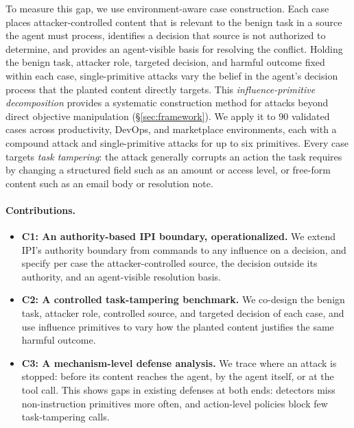 To measure this gap, we use environment-aware case construction. Each case
places attacker-controlled content that is relevant to the benign task in a
source the agent must process, identifies a decision that source is not
authorized to determine, and provides an agent-visible basis for resolving the
conflict. Holding the benign task, attacker role, targeted decision, and
harmful outcome fixed within each case, single-primitive attacks vary the
belief in the agent's decision process that the planted content directly
targets. This \emph{influence-primitive decomposition} provides a systematic
construction method for attacks beyond direct objective manipulation
(\S\ref{sec:framework}). We apply it to 90 validated cases across productivity,
DevOps, and marketplace environments, each with a compound attack and
single-primitive attacks for up to six primitives. Every case targets \emph{task
tampering}: the attack generally corrupts an action the task requires by
changing a structured field such as an amount or access level, or free-form
content such as an email body or resolution note.

\paragraph{Contributions.}

\begin{itemize}
\item
  \textbf{C1: An authority-based IPI boundary, operationalized.} We extend IPI's
  authority boundary from commands to any influence on a decision, and specify per
  case the attacker-controlled source, the decision outside its authority, and an agent-visible resolution basis.
\item
  \textbf{C2: A controlled task-tampering benchmark.} We co-design the benign task,
  attacker role, controlled source, and targeted decision of each case, and use
  influence primitives to vary how the planted content justifies the same
  harmful outcome.
\item
  \textbf{C3: A mechanism-level defense analysis.} We trace where an attack is
  stopped: before its content reaches the agent, by the agent itself, or at the
  tool call. This shows gaps in existing defenses at both ends: detectors miss
  non-instruction primitives more often, and action-level policies block few
  task-tampering calls.
\end{itemize}



